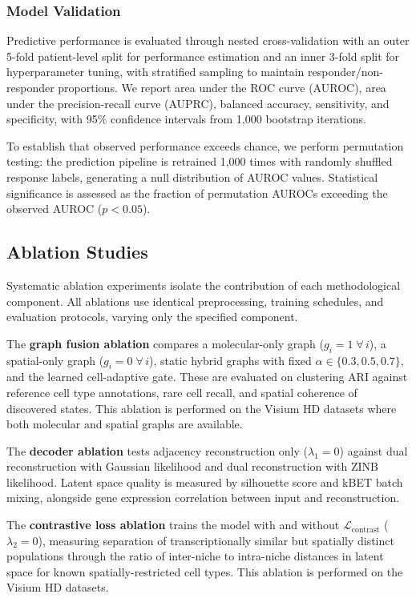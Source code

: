 \documentclass{article}
\begin{document}
\subsubsection{Model Validation}

Predictive performance is evaluated through nested cross-validation with an outer 5-fold patient-level split for performance estimation and an inner 3-fold split for hyperparameter tuning, with stratified sampling to maintain responder/non-responder proportions. We report area under the ROC curve (AUROC), area under the precision-recall curve (AUPRC), balanced accuracy, sensitivity, and specificity, with 95\% confidence intervals from 1{,}000 bootstrap iterations.

To establish that observed performance exceeds chance, we perform permutation testing: the prediction pipeline is retrained 1{,}000 times with randomly shuffled response labels, generating a null distribution of AUROC values. Statistical significance is assessed as the fraction of permutation AUROCs exceeding the observed AUROC ($p < 0.05$).


\subsection{Ablation Studies}
\label{sec:ablations}

Systematic ablation experiments isolate the contribution of each methodological component. All ablations use identical preprocessing, training schedules, and evaluation protocols, varying only the specified component.

The \textbf{graph fusion ablation} compares a molecular-only graph ($g_i = 1 \;\forall\, i$), a spatial-only graph ($g_i = 0 \;\forall\, i$), static hybrid graphs with fixed $\alpha \in \{0.3, 0.5, 0.7\}$, and the learned cell-adaptive gate. These are evaluated on clustering ARI against reference cell type annotations, rare cell recall, and spatial coherence of discovered states. This ablation is performed on the Visium HD datasets where both molecular and spatial graphs are available.

The \textbf{decoder ablation} tests adjacency reconstruction only ($\lambda_1 = 0$) against dual reconstruction with Gaussian likelihood and dual reconstruction with ZINB likelihood. Latent space quality is measured by silhouette score and kBET batch mixing, alongside gene expression correlation between input and reconstruction.

The \textbf{contrastive loss ablation} trains the model with and without $\mathcal{L}_{\text{contrast}}$ ($\lambda_2 = 0$), measuring separation of transcriptionally similar but spatially distinct populations through the ratio of inter-niche to intra-niche distances in latent space for known spatially-restricted cell types. This ablation is performed on the Visium HD datasets.
\end{document}
